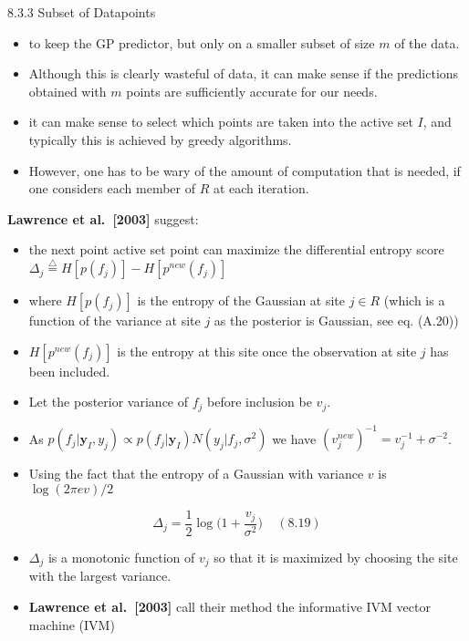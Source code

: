\documentclass[
  ignorenonframetext,
]{beamer}
\providecommand{\tightlist}{%
  \setlength{\itemsep}{0pt}\setlength{\parskip}{0pt}}
\begin{document}
\begin{frame}{8.3.3 Subset of Datapoints}
\protect\hypertarget{subset-of-datapoints}{}
\begin{itemize}
\item
  to keep the GP predictor, but only on a smaller subset of size \(m\)
  of the data.
\item
  Although this is clearly wasteful of data, it can make sense if the
  predictions obtained with \(m\) points are sufficiently accurate for
  our needs.
\item
  it can make sense to select which points are taken into the active set
  \(I\), and typically this is achieved by greedy algorithms.
\item
  However, one has to be wary of the amount of computation that is
  needed, if one considers each member of \(R\) at each iteration.
\end{itemize}
\end{frame}

\begin{frame}{}
\protect\hypertarget{section-15}{}
\textbf{Lawrence et al.~{[}2003{]}} suggest:

\begin{itemize}
\item
  the next point active set point can maximize the differential entropy
  score
  \(\Delta_j \stackrel {\bigtriangleup} = H[p(f_j)] - H[p^{new}(f_j)]\)
\item
  where \(H[p(f_j)]\) is the entropy of the Gaussian at site \(j \in R\)
  (which is a function of the variance at site \(j\) as the posterior is
  Gaussian, see eq. (A.20))
\item
  \(H[p^{new}(f_j)]\) is the entropy at this site once the observation
  at site \(j\) has been included.
\item
  Let the posterior variance of \(f_j\) before inclusion be \(v_j\).
\item
  As
  \(p(f_j|\pmb y_I, y_j) \propto p(f_j|\pmb y_I)N(y_j|f_j, \sigma^2)\)
  we have \((v_j^{new})^{-1} = v_j^{-1} + \sigma^{-2}\).
\end{itemize}
\end{frame}

\begin{frame}{}
\protect\hypertarget{section-16}{}
\begin{itemize}
\tightlist
\item
  Using the fact that the entropy of a Gaussian with variance \(v\) is
  \(\log(2\pi e v)/2\)
\end{itemize}

\[
\Delta_j = \frac 1 2 \log \Big(1 + \frac {v_j} {\sigma^2}\Big) \ \ \ \ \ (8.19) 
\]

\begin{itemize}
\item
  \(\Delta_j\) is a monotonic function of \(v_j\) so that it is
  maximized by choosing the site with the largest variance.
\item
  \textbf{Lawrence et al.~{[}2003{]}} call their method the informative
  IVM vector machine (IVM)
\end{itemize}
\end{frame}
\end{document}
